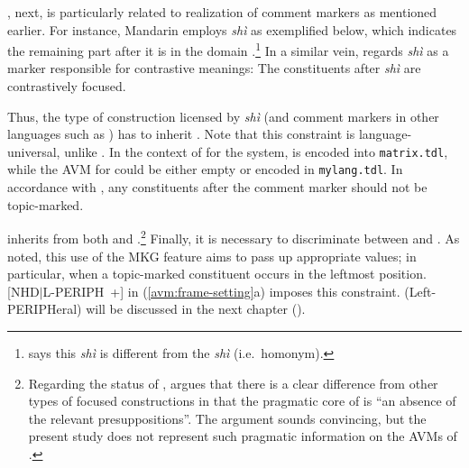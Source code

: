 , next, is particularly related to realization of
comment markers as mentioned earlier. For instance, Mandarin
 employs \textit{sh\`{i}} as exemplified below, which
indicates the remaining part after it is in the  domain
\citep{prince:12}.\footnote{\citet{prince:12} says this
  \textit{sh\`{i}} is different from the  \textit{sh\`{i}}
  (i.e.\ homonym).} In a similar vein, \citet{li:09} regards
\textit{sh\`{i}} as a marker responsible for contrastive meanings: The
constituents after \textit{sh\`{i}} are contrastively focused.




\noindent Thus, the type of construction licensed by \textit{sh\`{i}}
(and comment markers in other languages such as 
\citep{schneider:09}) has to inherit .  Note
that this constraint is language-universal, unlike
. In the context of  for
the \lingo {} system,  is
encoded into \texttt{matrix.tdl}, while the AVM for 
could be either empty or encoded in \texttt{mylang.tdl}.  In
accordance with , any constituents after the
comment marker should not be topic-marked.




 inherits from both  and
.\footnote{Regarding the status of ,
  \citet[p.\ 232]{lambrecht:96} argues that there is a clear
  difference from other types of focused constructions in that the
  pragmatic core of  is ``an absence of the relevant
  presuppositions''.  The argument sounds convincing, but the present
  study does not represent such pragmatic information on the AVMs of
  .} Finally, it is
necessary to discriminate between  and
. As noted, this use of the MKG feature aims to
pass up appropriate values; in particular, when a topic-marked
constituent occurs in the leftmost
position. \mbox{[NHD{$\mid$}L-PERIPH +]} in (\ref{avm:frame-setting}a)
imposes this constraint.
 (Left-PERIPHeral) will be discussed in the next chapter
().



